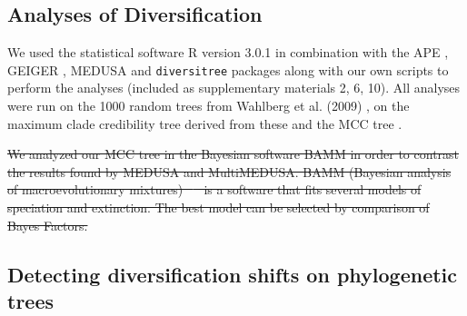 \documentclass[10pt]{article}
\providecommand{\DIFdeltex}[1]{{\protect\color{red}\sout{#1}}}                      %
\providecommand{\DIFdelbegin}{} %
\providecommand{\DIFdelend}{} %
\providecommand{\DIFdel}[1]{\texorpdfstring{\DIFdeltex{#1}}{}} %
\begin{document}
\subsection*{Analyses of Diversification}

We used the statistical software R version 3.0.1 \cite{r2013} in combination
with the APE \cite{popescu2012}, GEIGER \cite{harmon2008}, MEDUSA
\cite{alfaro2009} and
\texttt{diversitree} \cite{fitzjohn2012} packages along with our own scripts to
perform the analyses (included as supplementary materials 2, 6, 10). All
analyses were run on the 1000 random trees from Wahlberg et al. (2009)
\cite{wahlberg2009}, on the maximum clade credibility tree derived from these and
the MCC tree \cite{wahlberg2009}.


\DIFdelbegin \DIFdel{We analyzed our MCC tree in the Bayesian software BAMM in order to
contrast the results found by MEDUSA and MultiMEDUSA. BAMM (Bayesian
analysis of macroevolutionary mixtures) \mbox{%
\cite{rabosky2014}
}%
is a software that fits
several models of speciation and extinction. The best model can be
selected by comparison of Bayes Factors.
}%

\DIFdelend \subsection*{Detecting diversification shifts on phylogenetic trees}
\end{document}
